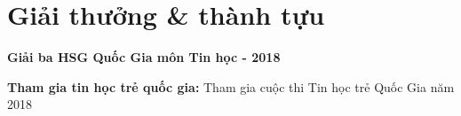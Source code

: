 \documentclass[letterpaper,11pt]{article}
\newcommand{\resumeSubHeadingListStart}{\begin{itemize}[leftmargin=0.15in, label={}]}
\newcommand{\resumeSubHeadingListEnd}{\end{itemize}}
\begin{document}
\section{Giải thưởng \& thành tựu}
  \vspace{2pt}
  \resumeSubHeadingListStart
    \small{\item{
        \textbf{Giải ba HSG Quốc Gia môn Tin học - 2018} \\ \vspace{3pt}
        
        \textbf{Tham gia tin học trẻ quốc gia:}{ Tham gia cuộc thi Tin học trẻ Quốc Gia năm 2018} \\ \vspace{3pt}
        
        
    }}
  \resumeSubHeadingListEnd


        




    
\end{document}
